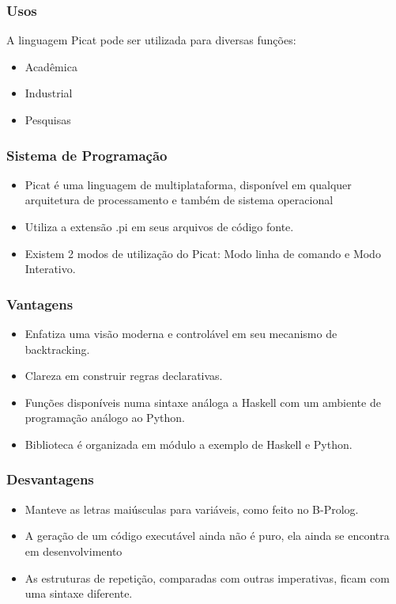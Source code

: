 \documentclass[10pt]{beamer}
\begin{document}

\begin{frame}
    \frametitle{Usos}
    A linguagem Picat pode ser utilizada para diversas funções:
    \begin{itemize}
     \item Acadêmica
     \item Industrial
     \item Pesquisas
    \end{itemize}
\end{frame}



\begin{frame}
    \frametitle{Sistema de Programação}
    \begin{itemize}
     \item Picat é uma linguagem de multiplataforma, disponível em qualquer arquitetura de processamento e também de sistema operacional
     \item Utiliza a extensão .pi em seus arquivos de código fonte. 
     \item Existem 2 modos de utilização do Picat: Modo linha de comando e Modo Interativo. 
    \end{itemize}
\end{frame}


\begin{frame}
    \frametitle{Vantagens}
    \begin{itemize}
     \item Enfatiza uma visão moderna e controlável em seu mecanismo de backtracking.
     \item Clareza em construir regras declarativas.
     \item Funções disponíveis numa sintaxe análoga a Haskell com um ambiente de programação análogo ao Python.
     \item Biblioteca é organizada em módulo a exemplo de Haskell e Python. 
    \end{itemize}
\end{frame}


\begin{frame}
    \frametitle{Desvantagens}
    \begin{itemize}
     \item Manteve as letras maiúsculas para variáveis, como feito no B-Prolog.
     \item A geração de um código executável ainda não é puro, ela ainda se encontra em desenvolvimento
     \item As estruturas de repetição, comparadas com outras imperativas, ficam com uma sintaxe diferente. 
    \end{itemize}
\end{frame}
\end{document}
